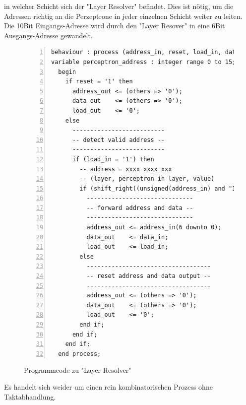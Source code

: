 \documentclass{article}
\numberwithin{equation}{section}
\begin{document}
in welcher Schicht sich der "Layer Resolver" befindet. Dies ist nötig, um die Adressen richtig 
an die Perzeptrone in jeder einzelnen Schicht weiter zu leiten. Die 10Bit Eingangs-Adresse 
wird durch den "Layer Resover" in eine 6Bit Ausgangs-Adresse gewandelt.
\begin{figure}[htbp]
\begin{lstlisting}[style=VHDL,numbers=left,stepnumber=1,basicstyle=\footnotesize]
behaviour : process (address_in, reset, load_in, data_in) is
variable perceptron_address : integer range 0 to 15;
  begin
    if reset = '1' then
      address_out <= (others => '0');
      data_out    <= (others => '0');
      load_out    <= '0';
    else
      --------------------------
      -- detect valid address --
      --------------------------
      if (load_in = '1') then
        -- address = xxxx xxxx xxx 
        -- (layer, perceptron in layer, value)
        if (shift_right((unsigned(address_in) and "11110000000"), 7) = layer_count) then
          ------------------------------
          -- forward address and data --
          ------------------------------
          address_out <= address_in(6 downto 0);
          data_out    <= data_in;
          load_out    <= load_in;
        else
          -----------------------------------
          -- reset address and data output --
          -----------------------------------
          address_out <= (others => '0');
          data_out    <= (others => '0');
          load_out    <= '0';
        end if;
      end if;
    end if;
  end process;
\end{lstlisting}
\caption{Programmcode zu "Layer Resolver"} \label{code:layer_resolver}
\end{figure}
\FloatBarrier
Es handelt sich weider um einen rein kombinatorischen Prozess ohne Taktabhandlung.
\end{document}
